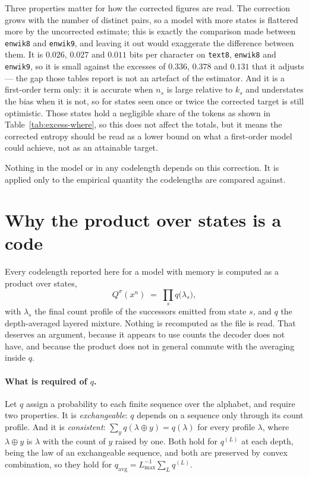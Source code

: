 \documentclass[11pt]{article}
\begin{document}
Three properties matter for how the corrected figures are read.  The
correction grows with the number of distinct pairs, so a model with
more states is flattered more by the uncorrected estimate; this is
exactly the comparison made between \texttt{enwik8} and
\texttt{enwik9}, and leaving it out would exaggerate the difference
between them.  It is $0.026$, $0.027$ and $0.011$ bits per character on
\texttt{text8}, \texttt{enwik8} and \texttt{enwik9}, so it is small
against the excesses of $0.336$, $0.378$ and $0.131$ that it adjusts
--- the gap those tables report is not an artefact of the estimator.
And it is a first-order term only: it is accurate when $n_s$ is large
relative to $k_s$ and understates the bias when it is not, so for
states seen once or twice the corrected target is still optimistic.
Those states hold a negligible share of the tokens
as shown in Table~\ref{tab:excess-where}, so this does not affect the totals,
but it means the corrected entropy should be read as a lower bound on
what a first-order model could achieve, not as an attainable target.

Nothing in the model or in any codelength depends on this correction.
It is applied only to the empirical quantity the codelengths are
compared against.

\section{Why the product over states is a code}
\label{app:factorisation}

Every codelength reported here for a model with memory is computed as a
product over states,
\[
  Q^{\sigma}(x^n) \;=\; \prod_{s} q\bigl(\lambda_s\bigr),
\]
with $\lambda_s$ the final count profile of the successors emitted from
state $s$, and $q$ the depth-averaged layered mixture.  Nothing is
recomputed as the file is read.  That deserves an argument, because it
appears to use counts the decoder does not have, and because the
product does not in general commute with the averaging inside $q$.

\paragraph{What is required of $q$.}  Let $q$ assign a probability to
each finite sequence over the alphabet, and require two properties.  It
is \emph{exchangeable}: $q$ depends on a sequence only through its count
profile.  And it is \emph{consistent}:
$\sum_{y} q(\lambda \oplus y) = q(\lambda)$ for every profile $\lambda$,
where $\lambda \oplus y$ is $\lambda$ with the count of $y$ raised by
one.  Both hold for $q^{(L)}$ at each depth, being the law of an
exchangeable sequence, and both are preserved by convex combination, so
they hold for $q_{\mathrm{avg}} = L_{\max}^{-1}\sum_L q^{(L)}$.
\end{document}
